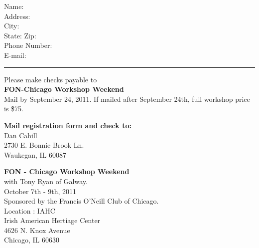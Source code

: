 \documentclass[letterpaper]{article}
\begin{document}
\begin{minipage}[h]{0.45\textwidth}
Name: \hrulefill{}\\

Address:  \hrulefill{}\\

City: \hrulefill{}\\

State: \hrulefill{} \hspace*{1em} Zip: \hrulefill{}\\

Phone Number: \hrulefill{}\\

E-mail: \hrulefill{}\\
\end{minipage}
\vspace*{2em}
\hrule
\vspace*{1em}
\begin{minipage}[b]{0.45\textwidth}
\vspace{0pt}
Please make checks payable to \\\textbf{FON-Chicago Workshop Weekend}\\Mail by September 24, 2011. If mailed after September 24th, full workshop price is \$75.


\vspace*{1em}

\hspace{0em}\textbf{Mail registration form and check to:}\\
Dan Cahill\\
2730 E. Bonnie Brook Ln.\\
Waukegan, IL 60087
\end{minipage}
\hfill
\begin{minipage}[b]{0.45\textwidth}
\vspace{0pt}
{\large\textbf{FON - Chicago Workshop Weekend}}\\ 

with Tony Ryan of Galway.\\October 7th - 9th, 2011\\ Sponsored by the Francis O'Neill Club of Chicago.\\

\vspace*{0.5em}
Location : IAHC\\
Irish American Hertiage Center\\
4626 N. Knox Avenue\\
Chicago, IL  60630
\end{minipage}
\end{document}
